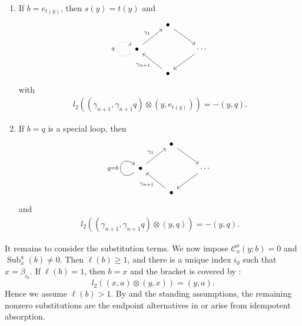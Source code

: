 \documentclass[11pt,a4paper,reqno]{amsart}
\newcommand{\mC}{\mathcal C}
\newcommand{\Sub}{\operatorname{Sub}}
\newcommand{\para}[2]{(#1,#2)}
\newcommand{\bi}{\beta_{i_0}}
\theoremstyle{plain}
\theoremstyle{definition}
\numberwithin{equation}{section}
\begin{document}
	\begin{enumerate}
		\item If $b=e_{t(y)}$, then $s(y)=t(y)$ and
		\[
		\begin{tikzcd}
			& \bullet & \\
			\bullet && \cdots \\
			& \bullet
			\arrow[from=1-2, to=2-3]
			\arrow["{\gamma_1}", from=2-1, to=1-2]
			\arrow["{q}",dotted, from=2-1, to=2-1, loop, in=145, out=215, distance=10mm]
			\arrow[from=2-3, to=3-2]
			\arrow["{\gamma_{n+1}}", from=3-2, to=2-1]
		\end{tikzcd}
		\]
		with
		\begin{align}
			l_2(\para{\gamma_{n+1}}{\gamma_{n+1}q}
			\otimes\para{y}{e_{t(y)}})
			=-\para{y}{q}.
		\end{align}
		
		\item If $b=q$ is a special loop, then
		\[
		\begin{tikzcd}
			& \bullet & \\
			\bullet && \cdots \\
			& \bullet
			\arrow[from=1-2, to=2-3]
			\arrow["{\gamma_1}", from=2-1, to=1-2]
			\arrow["{q=b}", from=2-1, to=2-1, loop, in=145, out=215, distance=10mm]
			\arrow[from=2-3, to=3-2]
			\arrow["{\gamma_{n+1}}", from=3-2, to=2-1]
		\end{tikzcd}
		\]
		and
		\begin{align}
			l_2(\para{\gamma_{n+1}}{\gamma_{n+1}q}\otimes\para{y}{q})
			=-\para{y}{q}.
		\end{align}
	\end{enumerate}
	It remains to consider the substitution terms.  We now impose
	$\mC_x^a(y;b)=0$
	and $\Sub_x^a(b)\neq0$.
	Then $\ell(b)\ge1$, and there is a unique index $i_0$ such that
	$x=\bi$.  If $\ell(b)=1$, then $b=x$ and the bracket is covered by
	:
	\[
	l_2(\para{x}{a}\otimes\para{y}{x})=\para{y}{a}.
	\]
	Hence we assume $\ell(b)>1$.  By  and the
	standing assumptions, the remaining nonzero substitutions are the endpoint alternatives in
	 or arise from idempotent absorption.
	
\end{document}

